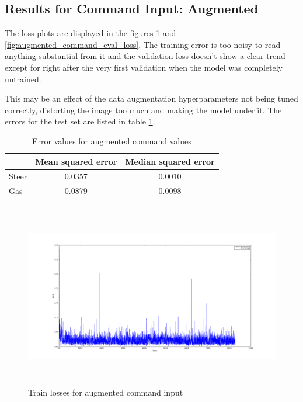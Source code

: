 \documentclass[a4paper]{article}
\begin{document}
\subsection{Results for Command Input: Augmented}
The loss plots are displayed in the figures \ref{fig:augmented_command_train_loss}
and \ref{fig:augmented_command_eval_loss}. The training error is too noisy to
read anything substantial from it and the validation loss doesn't show a clear
trend except for right after the very first validation when the model was
completely untrained.

This may be an effect of the data augmentation hyperparameters not being tuned
correctly, distorting the image too much and making the model underfit.
The errors for the test set are listed in table \ref{tab:error_command_aug}.
\begin{table}[H]
  \centering
  \caption{Error values for augmented command values}
  \begin{tabular}{lcc}
    &Mean squared error& Median squared error \\ \hline
    Steer & 0.0357 & 0.0010 \\
    Gas &0.0879&0.0098
  \end{tabular}
  \label{tab:error_command_aug}
\end{table}
  \begin{figure}[H]
    \centering
    \includegraphics[width=\textwidth, height=8cm]{../pics/command_input_training_augmented.png}
    \caption{Train losses for augmented command input}
    \label{fig:augmented_command_train_loss}
  \end{figure}
\end{document}
